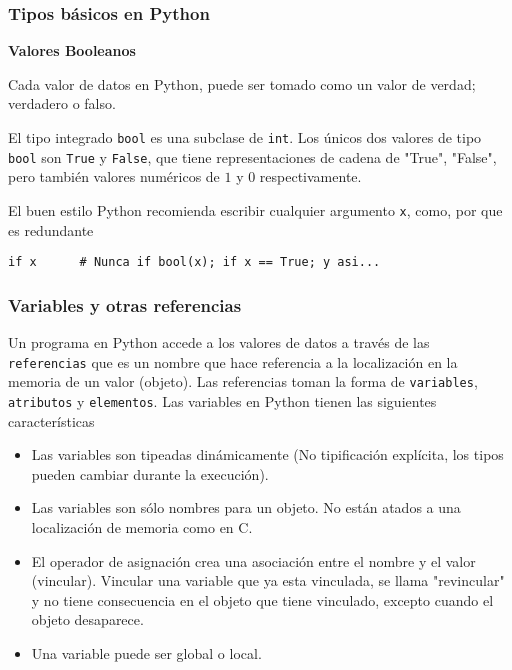 \documentclass[10pt]{beamer}
\begin{document}
\begin{frame}[fragile]
\frametitle{Tipos b\'asicos en Python}

\textbf{Valores Booleanos}

\vspace{0.2cm}

Cada valor de datos en Python, puede ser tomado como un valor de verdad; verdadero o falso.

\vspace{0.3cm}

El tipo integrado \texttt{bool} es una subclase de \texttt{int}. Los \'unicos dos valores de tipo \texttt{bool} son \texttt{True} y \texttt{False}, que tiene representaciones de cadena de "True", "False", pero tambi\'en valores num\'ericos de $1$ y $0$ respectivamente.


\vspace{0.2cm}

El buen estilo  Python recomienda  escribir cualquier argumento \texttt{x}, como, por que es redundante  

\vspace{0.2cm}


\begin{lstlisting}
if x      # Nunca if bool(x); if x == True; y asi...
\end{lstlisting}

\end{frame}

\begin{frame}[fragile]
\frametitle{Variables y otras referencias}
Un programa en Python accede a los valores de datos a trav\'es de las \texttt{referencias} que es un nombre que hace referencia a la localizaci\'on en la memoria de un valor (objeto). Las referencias toman la forma de \texttt{variables}, \texttt{atributos} y \texttt{elementos}. Las variables en Python tienen las siguientes caracter\'isticas

\vspace{0.2cm}


\begin{itemize}
\item Las variables son tipeadas din\'amicamente (No tipificaci\'on expl\'icita, los tipos pueden cambiar durante la execuci\'on).
\item Las variables son s\'olo nombres para un objeto. No est\'an atados a una localizaci\'on de memoria como en C.

\item El operador de asignaci\'on crea una asociaci\'on entre el nombre y el valor (vincular).  Vincular una variable que ya esta vinculada, se llama "revincular" y no tiene consecuencia en el objeto que tiene vinculado, excepto cuando el objeto desaparece.

\item Una variable puede ser global o local.
\end{itemize}
\end{frame}
\end{document}

